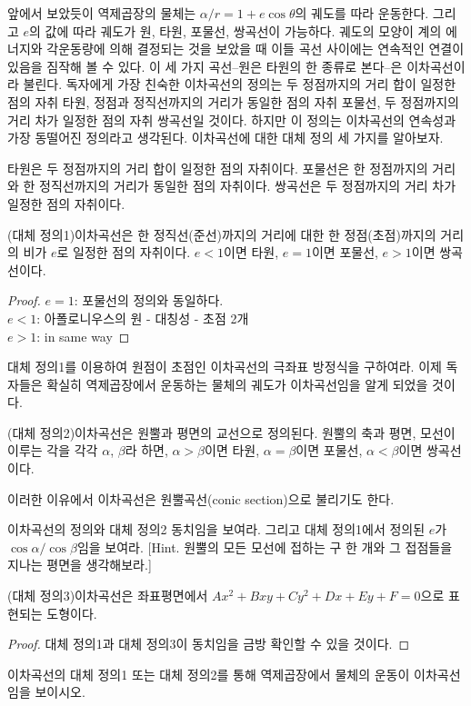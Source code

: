 앞에서 보았듯이 역제곱장의 물체는 $\alpha/r=1+e\cos\theta$의 궤도를 따라 운동한다. 그리고 $e$의 값에 따라 궤도가 원, 타원, 포물선, 쌍곡선이 가능하다. 궤도의 모양이 계의 에너지와 각운동량에 의해 결정되는 것을 보았을 때 이들 곡선 사이에는 연속적인 연결이 있음을 짐작해 볼 수 있다. 이 세 가지 곡선--원은 타원의 한 종류로 본다--은 이차곡선이라 불린다. 독자에게 가장 친숙한 이차곡선의 정의는 두 정점까지의 거리 합이 일정한 점의 자취 타원, 정점과 정직선까지의 거리가 동일한 점의 자취 포물선, 두 정점까지의 거리 차가 일정한 점의 자취 쌍곡선일 것이다. 하지만 이 정의는 이차곡선의 연속성과 가장 동떨어진 정의라고 생각된다. 이차곡선에 대한 대체 정의 세 가지를 알아보자.
\begin{definition}
    타원은 두 정점까지의 거리 합이 일정한 점의 자취이다. 포물선은 한 정점까지의 거리와 한 정직선까지의 거리가 동일한 점의 자취이다. 쌍곡선은 두 정점까지의 거리 차가 일정한 점의 자취이다. 
\end{definition}
\begin{theorem}
    (대체 정의1)이차곡선은 한 정직선(준선)까지의 거리에 대한 한 정점(초점)까지의 거리의 비가 $e$로 일정한 점의 자취이다. $e<1$이면 타원, $e=1$이면 포물선, $e>1$이면 쌍곡선이다.
\end{theorem}
\begin{proof}
    $e=1$: 포물선의 정의와 동일하다. \\
    $e<1$: 아폴로니우스의 원 - 대칭성 - 초점 2개 \\
    $e>1$: in same way
\end{proof}
\begin{exercise}
    대체 정의1를 이용하여 원점이 초점인 이차곡선의 극좌표 방정식을 구하여라. 이제 독자들은 확실히 역제곱장에서 운동하는 물체의 궤도가 이차곡선임을 알게 되었을 것이다.
\end{exercise}
\begin{theorem}
    (대체 정의2)이차곡선은 원뿔과 평면의 교선으로 정의된다. 원뿔의 축과 평면, 모선이 이루는 각을 각각 $\alpha$, $\beta$라 하면, $\alpha>\beta$이면 타원, $\alpha=\beta$이면 포물선, $\alpha<\beta$이면 쌍곡선이다.
\end{theorem}
\begin{remark}
    이러한 이유에서 이차곡선은 원뿔곡선(conic section)으로 불리기도 한다. 
\end{remark}
\begin{exercise}
    이차곡선의 정의와 대체 정의2 동치임을 보여라. 그리고 대체 정의1에서 정의된 $e$가 $\cos\alpha/\cos\beta$임을 보여라. [Hint. 원뿔의 모든 모선에 접하는 구 한 개와 그 접점들을 지나는 평면을 생각해보라.]
\end{exercise}
\begin{theorem}
    (대체 정의3)이차곡선은 좌표평면에서 $Ax^2+Bxy+Cy^2+Dx+Ey+F=0$으로 표현되는 도형이다.
\end{theorem}
\begin{proof}
    대체 정의1과 대체 정의3이 동치임을 금방 확인할 수 있을 것이다.
\end{proof}
\begin{exercise}
    이차곡선의 대체 정의1 또는 대체 정의2를 통해 역제곱장에서 물체의 운동이 이차곡선임을 보이시오. 
\end{exercise}

